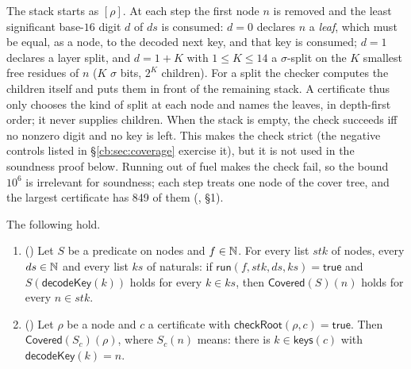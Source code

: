 \begin{remark}\label{cb:rem:cert}
The stack starts as $[\rho]$. At each step the first node $n$ is removed and the least significant base-$16$ digit $d$ of
$ds$ is consumed: $d=0$ declares $n$ a \emph{leaf}, which must be equal, as a node, to the decoded next key, and that
key is consumed; $d=1$ declares a layer split, and $d=1+K$ with $1\le K\le14$ a $\sigma$-split on the $K$ smallest
free residues of $n$ ($K$ $\sigma$ bits, $2^K$ children). For a
split the checker computes the children itself and puts them in front of the remaining stack. A certificate thus only
chooses the kind of split at each node and names the leaves, in depth-first order; it never supplies children. When
the stack is empty, the check succeeds iff no nonzero digit and no key is left. This makes the check strict (the
negative controls listed in \S\ref{cb:sec:coverage} exercise it), but it is not used in the soundness proof below.
Running out of fuel makes the check fail, so the bound $10^6$ is irrelevant for soundness; each step treats one node
of the cover tree, and the largest certificate has 849 of them (, \S1).
\end{remark}

\begin{lemma}\label{cb:lem:run}
The following hold.
\begin{enumerate}[label=(\alph*)]
\item () Let $S$ be a predicate on nodes and $f\in\mathbb N$. For every list $stk$ of nodes, every $ds\in\mathbb N$
  and every list $ks$ of naturals: if $\mathsf{run}(f,stk,ds,ks)=\mathsf{true}$ and $S(\mathsf{decodeKey}(k))$ holds
  for every $k\in ks$, then $\mathsf{Covered}(S)(n)$ holds for every $n\in stk$.
\item () Let $\rho$ be a node and $c$ a certificate with
  $\mathsf{checkRoot}(\rho,c)=\mathsf{true}$. Then $\mathsf{Covered}(S_c)(\rho)$, where $S_c(n)$ means: there is
  $k\in\mathsf{keys}(c)$ with $\mathsf{decodeKey}(k)=n$.
\end{enumerate}
\end{lemma}

